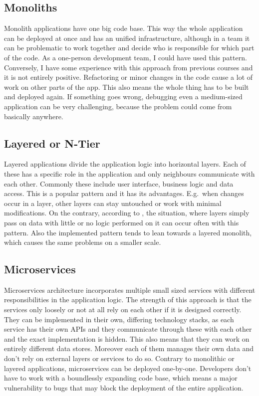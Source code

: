 \subsection{Monoliths}

Monolith applications have one big code base. This way the whole application can be deployed at once and has an unified infrastructure, although in a team it can be problematic to work together and decide who is responsible for which part of the code. As a one-person development team, I could have used this pattern. Conversely, I have some experience with this approach from previous courses and it is not entirely positive. Refactoring or minor changes in the code cause a lot of work on other parts of the app. This also means the whole thing has to be built and deployed again. If something goes wrong, debugging even a medium-sized application can be very challenging, because the problem could come from basically anywhere.

\subsection{Layered or N-Tier}

Layered applications divide the application logic into horizontal layers. Each of these has a specific role in the application and only neighbours communicate with each other. Commonly these include user interface, business logic and data access. This is a popular pattern and it has its advantages. E.g.\ when changes occur in a layer, other layers can stay untouched or work with minimal modifications. On the contrary, according to \cite{Patterns}, the situation, where layers simply pass on data with little or no logic performed on it can occur often with this pattern. Also the implemented pattern tends to lean towards a layered monolith, which causes the same problems on a smaller scale.

\subsection{Microservices}

 Microservices architecture \cite{MicroservicesArch} incorporates multiple small sized services with different responsibilities in the application logic. The strength of this approach is that the services only loosely or not at all rely on each other if it is designed correctly. They can be implemented in their own, differing technology stacks, as each service has their own APIs and they communicate through these with each other and the exact implementation is hidden. This also means that they can work on entirely different data stores. Moreover each of them manages their own data and don't rely on external layers or services to do so. Contrary to monolithic or layered applications, microservices can be deployed one-by-one. Developers don't have to work with a boundlessly expanding code base, which means a major vulnerability to bugs that may block the deployment of the entire application.
 
